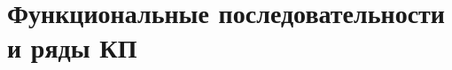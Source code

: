 \documentclass[../main.tex]{subfiles}
\begin{document}
 \chapter{Функциональные последовательности и ряды КП}
 
 
\end{document}
